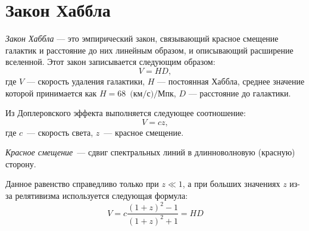 \section{Закон Хаббла}
\textit{Закон Хаббла} --- это эмпирический закон, связывающий красное смещение галактик и расстояние до них линейным образом, и описывающий расширение вселенной. Этот закон записывается следующим образом:
\begin{equation}
V=HD,
\end{equation}
где $V$ --- скорость удаления галактики, $H$ --- постоянная Хаббла, среднее значение которой принимается как $H=68$~$\text{(км/с)}/\text{Мпк}$, $D$ --- расстояние до галактики. 

Из Доплеровского эффекта выполняется следующее соотношение:
\begin{equation}
V=cz,
\end{equation}
где $c$~--- скорость света, $z$~--- красное смещение.

\textit{Красное смещение}~--- сдвиг спектральных линий в длинноволновую (красную) сторону. 

Данное равенство справедливо только при $z\ll1$, а при больших значениях $z$ из-за релятивизма используется следующая формула:
\begin{equation}
V=c\frac{(1+z)^2-1}{(1+z)^2+1}=HD
\end{equation}